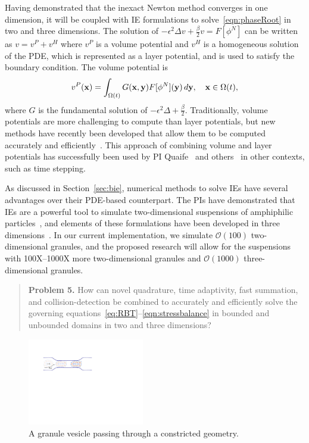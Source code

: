 Having demonstrated that the inexact Newton method converges in one
dimension, it will be coupled with IE formulations to
solve~\eqref{eqn:phaseRoot} in two and three dimensions. The solution of
$-\epsilon^2 \Delta v + \tfrac{\beta}{2} v = F[\phi^N]$ can be written
as $v = v^P + v^H$ where $v^P$ is a volume potential and $v^H$ is a
homogeneous solution of the PDE, which is represented as a layer
potential, and is used to satisfy the boundary condition. The volume
potential is
\begin{align*}
  v^{P}(\mathbf{x}) = \int_{\Omega(t)} G(\mathbf{x},\mathbf{y}) F[\phi^N](\mathbf{y})\, d\mathbf{y}, 
    \quad \mathbf{x} \in \Omega(t),
\end{align*}
where $G$ is the fundamental solution of $-\epsilon^2 \Delta +
\tfrac{\beta}{2}$. Traditionally, volume potentials are more challenging
to compute than layer potentials, but new methods have recently been
developed that allow them to be computed accurately and
efficiently~\cite{fry-leh-tor2018, and-zhu-vee2022}. This approach of
combining volume and layer potentials has successfully been used by PI
Quaife~\cite{kro-qua2010} and others~\cite{fry-kro-tor2019,
kli-ask-kro2020, che-hua-lei2005} in other contexts, such as time
stepping.

As discussed in Section~\ref{sec:bie},
numerical methods to solve IEs have several advantages over their
PDE-based counterpart. The PIs have demonstrated that IEs are a powerful
tool to simulate two-dimensional suspensions of amphiphilic
particles~\cite{Fu2018_SIAM, FuQuRyYo22, fu-ryh-qua-you2022}, and
elements of these formulations have been developed in three
dimensions~\cite{ying_2006, manasthesis, rac-gre2016}. In our current
implementation, we simulate $\mathcal{O}(100)$ two-dimensional granules,
and the proposed research will allow for the suspensions with
100X--1000X more two-dimensional granules and $\mathcal{O}(1000)$
three-dimensional granules. 

\begin{quotation}
  \noindent
  \textbf{Problem 5.} How can novel quadrature, time adaptivity, fast
  summation, and collision-detection be combined to accurately and
  efficiently solve the governing
  equations~\eqref{eq:RBT}--\eqref{eqn:stressbalance} in bounded and
  unbounded domains in two and three dimensions?
\end{quotation}

\begin{figure}
  \centering
  \includegraphics[width=2in]{figures/SA2Figures/confinement.pdf}
  \caption{\label{fig:stenosis} \footnotesize A granule vesicle passing
  through a constricted geometry.}
\end{figure}

